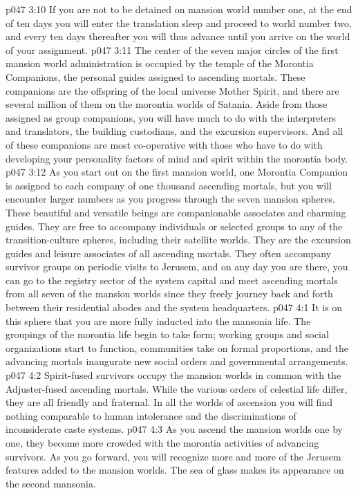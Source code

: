 \vs p047 3:10 If you are not to be detained on mansion world number one, at the end of ten days you will enter the translation sleep and proceed to world number two, and every ten days thereafter you will thus advance until you arrive on the world of your assignment.
\pc \vs p047 3:11 The center of the seven major circles of the first mansion world administration is occupied by the temple of the Morontia Companions, the personal guides assigned to ascending mortals. These companions are the offspring of the local universe Mother Spirit, and there are several million of them on the morontia worlds of Satania. Aside from those assigned as group companions, you will have much to do with the interpreters and translators, the building custodians, and the excursion supervisors. And all of these companions are most co\hyp{}operative with those who have to do with developing your personality factors of mind and spirit within the morontia body.
\vs p047 3:12 As you start out on the first mansion world, one Morontia Companion is assigned to each company of one thousand ascending mortals, but you will encounter larger numbers as you progress through the seven mansion spheres. These beautiful and versatile beings are companionable associates and charming guides. They are free to accompany individuals or selected groups to any of the transition\hyp{}culture spheres, including their satellite worlds. They are the excursion guides and leisure associates of all ascending mortals. They often accompany survivor groups on periodic visits to Jerusem, and on any day you are there, you can go to the registry sector of the system capital and meet ascending mortals from all seven of the mansion worlds since they freely journey back and forth between their residential abodes and the system headquarters.
\vs p047 4:1 It is on this sphere that you are more fully inducted into the mansonia life. The groupings of the morontia life begin to take form; working groups and social organizations start to function, communities take on formal proportions, and the advancing mortals inaugurate new social orders and governmental arrangements.
\vs p047 4:2 Spirit\hyp{}fused survivors occupy the mansion worlds in common with the Adjuster\hyp{}fused ascending mortals. While the various orders of celestial life differ, they are all friendly and fraternal. In all the worlds of ascension you will find nothing comparable to human intolerance and the discriminations of inconsiderate caste systems.
\vs p047 4:3 As you ascend the mansion worlds one by one, they become more crowded with the morontia activities of advancing survivors. As you go forward, you will recognize more and more of the Jerusem features added to the mansion worlds. The sea of glass makes its appearance on the second mansonia.
